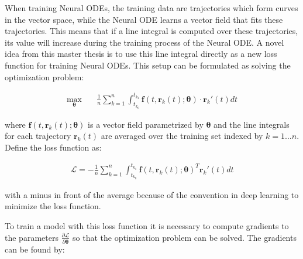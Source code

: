 \documentclass[12pt,a4paper]{book}
\begin{document}
When training Neural ODEs, the training data are trajectories which form curves in the vector space, while the Neural ODE learns a vector field that fits these trajectories. This means that if a line integral is computed over these trajectories, its value will increase during the training process of the Neural ODE. A novel idea from this master thesis is to use this line integral directly as a new loss function for training Neural ODEs. This setup can be formulated as solving the optimization problem:

\begin{equation}
    \begin{aligned}
        \max_{\bm{\theta}} \quad & \frac{1}{n} \sum_{k=1}^{n} \int_{t_{k_0}}^{t_{k_1}} \bm{f}(t, \bm{r}_k(t); \bm{\theta}) \cdot \bm{r}_k'(t) dt
    \end{aligned}
    \label{eq:lineintegralmax}
\end{equation}

\noindent where $\bm{f}(t, \bm{r}_k(t); \bm{\theta})$ is a vector field parametrized by $\bm{\theta}$ and the line integrals for each trajectory $\bm{r}_k(t)$ are averaged over the training set indexed by $k = 1 \dots n$. Define the loss function as:

\begin{equation}
    \begin{aligned}
        \mathcal{L} = - \frac{1}{n} \sum_{k=1}^{n} \int_{t_{k_0}}^{t_{k_1}} \bm{f}(t, \bm{r}_k(t); \bm{\theta})^T \bm{r}_k'(t) dt
    \end{aligned}
\end{equation}

\noindent with a minus in front of the average because of the convention in deep learning to minimize the loss function.

To train a model with this loss function it is necessary to compute gradients to the parameters $\frac{\partial \mathcal{L}}{\partial \bm{\theta}}$ so that the optimization problem can be solved. The gradients can be found by:
\end{document}
